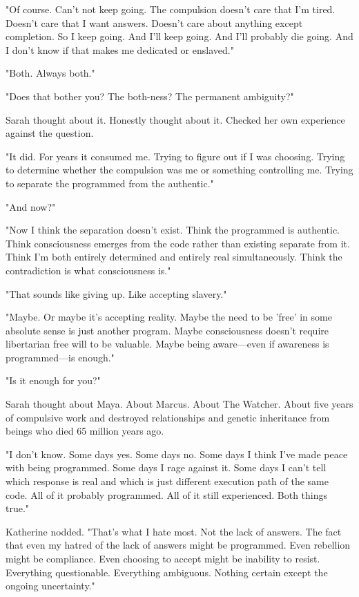 "Of course. Can't not keep going. The compulsion doesn't care that I'm tired. Doesn't care that I want answers. Doesn't care about anything except completion. So I keep going. And I'll keep going. And I'll probably die going. And I don't know if that makes me dedicated or enslaved."

"Both. Always both."

"Does that bother you? The both-ness? The permanent ambiguity?"

Sarah thought about it. Honestly thought about it. Checked her own experience against the question.

"It did. For years it consumed me. Trying to figure out if I was choosing. Trying to determine whether the compulsion was me or something controlling me. Trying to separate the programmed from the authentic."

"And now?"

"Now I think the separation doesn't exist. Think the programmed is authentic. Think consciousness emerges from the code rather than existing separate from it. Think I'm both entirely determined and entirely real simultaneously. Think the contradiction is what consciousness is."

"That sounds like giving up. Like accepting slavery."

"Maybe. Or maybe it's accepting reality. Maybe the need to be 'free' in some absolute sense is just another program. Maybe consciousness doesn't require libertarian free will to be valuable. Maybe being aware—even if awareness is programmed—is enough."

"Is it enough for you?"

Sarah thought about Maya. About Marcus. About The Watcher. About five years of compulsive work and destroyed relationships and genetic inheritance from beings who died 65 million years ago.

"I don't know. Some days yes. Some days no. Some days I think I've made peace with being programmed. Some days I rage against it. Some days I can't tell which response is real and which is just different execution path of the same code. All of it probably programmed. All of it still experienced. Both things true."

Katherine nodded. "That's what I hate most. Not the lack of answers. The fact that even my hatred of the lack of answers might be programmed. Even rebellion might be compliance. Even choosing to accept might be inability to resist. Everything questionable. Everything ambiguous. Nothing certain except the ongoing uncertainty."

